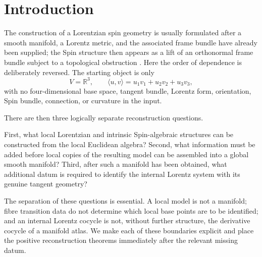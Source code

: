 \documentclass[11pt,a4paper]{article}
\theoremstyle{definition}
\theoremstyle{remark}
\newcommand{\R}{\mathbb{R}}
\begin{document}
\tableofcontents
\clearpage

\section{Introduction}

The construction of a Lorentzian spin geometry is usually formulated after
a smooth manifold, a Lorentz metric, and the associated frame bundle have
already been supplied; the Spin structure then appears as a lift of an
orthonormal frame bundle subject to a topological obstruction
\cite{LawsonMichelsohn,MilnorStasheff,Steenrod}.  Here the order of
dependence is deliberately reversed.  The starting object is only
\[
   V=\R^{3},\qquad
   \langle u,v\rangle=u_{1}v_{1}+u_{2}v_{2}+u_{3}v_{3},
\]
with no four-dimensional base space, tangent bundle, Lorentz form,
orientation, Spin bundle, connection, or curvature in the input.

There are then three logically separate reconstruction questions.

First, what local Lorentzian and intrinsic Spin-algebraic structures can be
constructed from the local Euclidean algebra?  Second, what information must be
added before local copies of the resulting model can be assembled into a
global smooth manifold?  Third, after such a manifold has been obtained,
what additional datum is required to identify the internal Lorentz system
with its genuine tangent geometry?

The separation of these questions is essential.  A local model is not a
manifold; fibre transition data do not determine which local base points
are to be identified; and an internal Lorentz cocycle is not, without
further structure, the derivative cocycle of a manifold atlas.  We make
each of these boundaries explicit and place the positive reconstruction
theorems immediately after the relevant missing datum.
\end{document}
